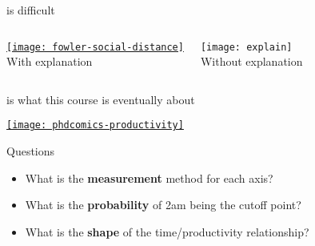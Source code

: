 \documentclass[t]{beamer}
\begin{document}
  \begin{frame}[c]{ is difficult}

    \begin{columns}[T]


      \begin{center}
        \href{http://jhfowler.ucsd.edu/alone_in_the_crowd.pdf}{\texttt{[image: fowler-social-distance]}}\\
        \vspace{0.25cm}
        With explanation
      \end{center}


      \begin{center}
        \texttt{[image: explain]}\\
        \vspace{0.25cm}
        Without explanation
      \end{center}

    \end{columns}     

  \end{frame}
  
  \begin{frame}[t]{ is what this course is eventually about}
    
    \begin{center}
      \href{http://www.phdcomics.com/comics.php?f=1219}{\texttt{[image: phdcomics-productivity]}}
    \end{center}
    
    \begin{exampleblock}{Questions}

      \begin{itemize}
        \item What is the \textbf{measurement} method for each axis?
        \item What is the \textbf{probability} of 2am being the cutoff point?   
        \item What is the \textbf{shape} of the time/productivity relationship?
      \end{itemize}

    \end{exampleblock}
    
  \end{frame}
  
\end{document}
